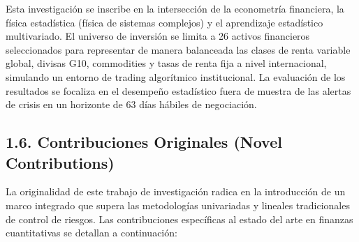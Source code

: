 \documentclass[
  12pt,
]{article}
\begin{document}
Esta investigación se inscribe en la intersección de la econometría
financiera, la física estadística (física de sistemas complejos) y el
aprendizaje estadístico multivariado. El universo de inversión se limita
a 26 activos financieros seleccionados para representar de manera
balanceada las clases de renta variable global, divisas G10, commodities
y tasas de renta fija a nivel internacional, simulando un entorno de
trading algorítmico institucional. La evaluación de los resultados se
focaliza en el desempeño estadístico fuera de muestra de las alertas de
crisis en un horizonte de 63 días hábiles de negociación.

\subsection{1.6. Contribuciones Originales (Novel
Contributions)}\label{contribuciones-originales-novel-contributions}

La originalidad de este trabajo de investigación radica en la
introducción de un marco integrado que supera las metodologías
univariadas y lineales tradicionales de control de riesgos. Las
contribuciones específicas al estado del arte en finanzas cuantitativas
se detallan a continuación:
\end{document}
